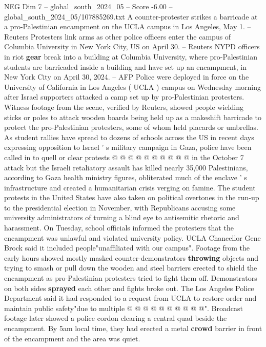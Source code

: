 \begin{textsample}{NEG Dim 7 – global\_south\_2024\_05 – Score -6.00 – global\_south\_2024\_05/107885269.txt}  \label{ex:f7_neg_387}
A counter-protester strikes a barricade at a pro-Palestinian encampment on the UCLA campus in Los Angeles, May 1. -- Reuters Protesters link arms as other police officers enter the campus of Columbia University in New York City, US on April 30. -- Reuters NYPD officers in riot \textbf{gear} break into a building at Columbia University, where pro-Palestinian students are barricaded inside a building and have set up an encampment, in New York City on April 30, 2024. -- AFP Police were deployed in force on the University of California in Los Angeles ( UCLA ) campus on Wednesday morning after Israel supporters attacked a camp set up by pro-Palestinian protesters.
Witness footage from the scene, verified by Reuters, showed people wielding sticks or poles to attack wooden boards being held up as a makeshift barricade to protect the pro-Palestinian protesters, some of whom held placards or umbrellas.
As student rallies have spread to dozens of schools across the US in recent days expressing opposition to Israel ' s military campaign in Gaza, police have been called in to quell or clear protests @ @ @ @ @ @ @ @ @ @ in the October 7 attack but the Israeli retaliatory assault has killed nearly 35,000 Palestinians, according to Gaza health ministry figures, obliterated much of the enclave ' s infrastructure and created a humanitarian crisis verging on famine.
The student protests in the United States have also taken on political overtones in the run-up to the presidential election in November, with Republicans accusing some university administrators of turning a blind eye to antisemitic rhetoric and harassment.
On Tuesday, school officials informed the protesters that the encampment was unlawful and violated university policy.
UCLA Chancellor Gene Brock said it included people"unaffiliated with our campus".
Footage from the early hours showed mostly masked counter-demonstrators \textbf{throwing} objects and trying to smash or pull down the wooden and steel barriers erected to shield the encampment as pro-Palestinian protesters tried to fight them off.
Demonstrators on both sides \textbf{sprayed} each other and fights broke out.
The Los Angeles Police Department said it had responded to a request from UCLA to restore order and maintain public safety"due to multiple @ @ @ @ @ @ @ @ @ @".
Broadcast footage later showed a police cordon clearing a central quad beside the encampment.
By 5am local time, they had erected a metal \textbf{crowd} barrier in front of the encampment and the area was quiet.

\end{textsample}
